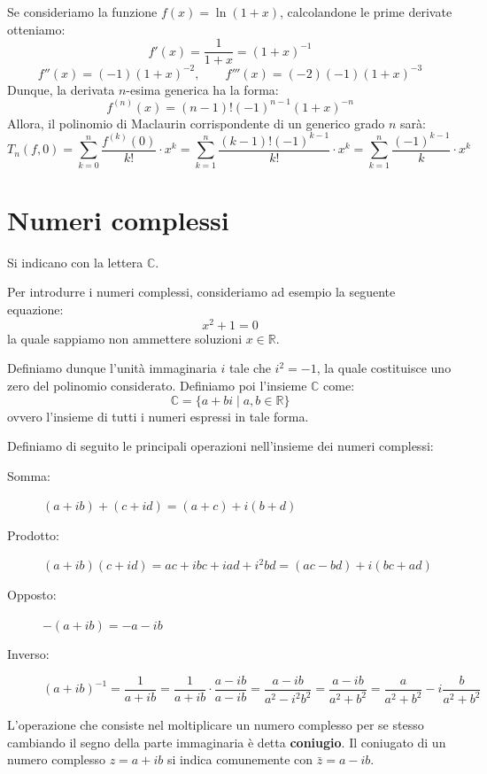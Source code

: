 \documentclass[12pt]{report}
\newcommand{\R}{\mathbb{R}}
\newcommand{\C}{\mathbb{C}}
\begin{document}
	Se consideriamo la funzione $f(x) = \ln(1+x)$, calcolandone le prime derivate otteniamo:
	\[
	f'(x) = \frac{1}{1+x} = (1+x)^{-1}
	\]
	\[
	f''(x) = (-1)(1+x)^{-2}, \qquad f'''(x) = (-2)(-1)(1+x)^{-3}
	\]
	Dunque, la derivata $n$-esima generica ha la forma:
	\[
	f^{(n)}(x) = (n-1)! (-1)^{n-1} (1+x)^{-n}
	\]
	Allora, il polinomio di Maclaurin corrispondente di un generico grado $n$ sarà:
	\[
	T_n(f, 0) = \sum_{k=0}^n \frac{f^{(k)}(0)}{k!} \cdot x^k = \sum_{k=1}^n \frac{(k-1)!(-1)^{k-1}}{k!} \cdot x^k = \sum_{k=1}^n \frac{(-1)^{k-1}}{k} \cdot x^k
	\]
	
	\chapter{Numeri complessi}
	Si indicano con la lettera $\C$.
	
	Per introdurre i numeri complessi, consideriamo ad esempio la seguente equazione:
	\[
	x^2 + 1 = 0
	\]
	la quale sappiamo non ammettere soluzioni $x \in \R$.
	
	Definiamo dunque l'unità immaginaria $i$ tale che $i^2 = -1$, la quale costituisce uno zero del polinomio considerato. Definiamo poi l'insieme $\C$ come:
	\[
	\C = \{a + bi \mid a, b \in \R\}
	\]
	ovvero l'insieme di tutti i numeri espressi in tale forma.
	
	Definiamo di seguito le principali operazioni nell'insieme dei numeri complessi:
	\begin{description}
		
		\item [Somma:] $(a + ib) + (c + id) = (a + c) + i(b + d)$
		
		\item [Prodotto:] $(a + ib)(c + id) = ac + ibc + iad + i^2 bd = (ac - bd) + i(bc + ad)$
		
		\item [Opposto:] $-(a + ib) = -a - ib$
		
		\item [Inverso:]
		\[
		(a + ib)^{-1} = \frac{1}{a + ib} = \frac{1}{a + ib} \cdot \frac{a - ib}{a - ib} = \frac{a - ib}{a^2 - i^2 b^2} = \frac{a - ib}{a^2 + b^2} = \frac{a}{a^2 + b^2} - i \frac{b}{a^2 + b^2}
		\]
		
	\end{description}
	
	\begin{osservazione}{}{}
		
		L'operazione che consiste nel moltiplicare un numero complesso per se stesso cambiando il segno della parte immaginaria è detta \textbf{coniugio}. Il coniugato di un numero complesso $z = a + ib$ si indica comunemente con $\bar{z} = a - ib$.
		
	\end{osservazione}
	
\end{document}

